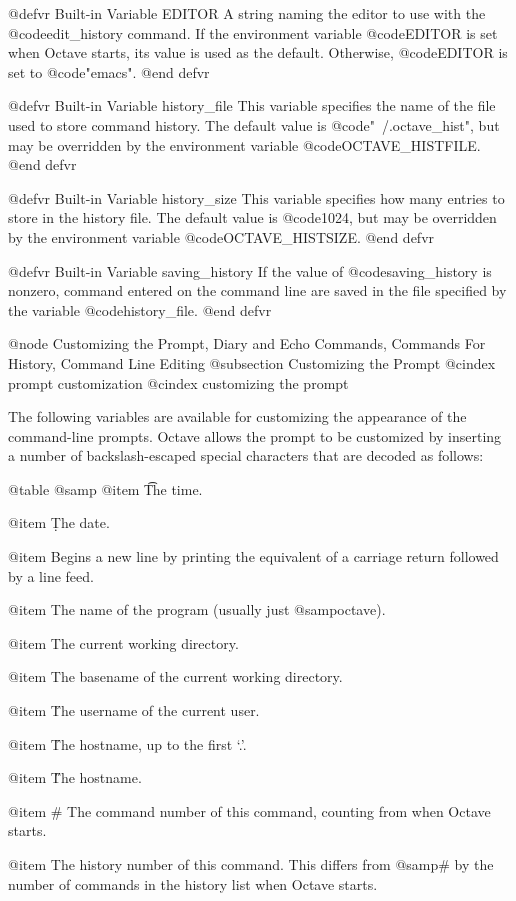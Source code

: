 @defvr {Built-in Variable} EDITOR
A string naming the editor to use with the @code{edit_history} command.
If the environment variable @code{EDITOR} is set when Octave starts, its
value is used as the default.  Otherwise, @code{EDITOR} is set to
@code{"emacs"}.
@end defvr

@defvr {Built-in Variable} history_file
This variable specifies the name of the file used to store command
history.  The default value is @code{"~/.octave_hist"}, but may be
overridden by the environment variable @code{OCTAVE_HISTFILE}.
@end defvr

@defvr {Built-in Variable} history_size
This variable specifies how many entries to store in the history file.
The default value is @code{1024}, but may be overridden by the
environment variable @code{OCTAVE_HISTSIZE}.
@end defvr

@defvr {Built-in Variable} saving_history
If the value of @code{saving_history} is nonzero, command entered
on the command line are saved in the file specified by the variable
@code{history_file}.
@end defvr

@node Customizing the Prompt, Diary and Echo Commands, Commands For History, Command Line Editing
@subsection Customizing the Prompt
@cindex prompt customization
@cindex customizing the prompt

The following variables are available for customizing the appearance of
the command-line prompts.  Octave allows the prompt to be customized by
inserting a number of backslash-escaped special characters that are
decoded as follows:

@table @samp
@item \t
The time.

@item \d
The date.

@item \n
Begins a new line by printing the equivalent of a carriage return
followed by a line feed.

@item \s
The name of the program (usually just @samp{octave}).

@item \w
The current working directory.

@item \W
The basename of the current working directory.

@item \u
The username of the current user.

@item \h
The hostname, up to the first `.'.

@item \H
The hostname.

@item \#
The command number of this command, counting from when Octave starts.

@item \!
The history number of this command.  This differs from @samp{\#} by the
number of commands in the history list when Octave starts.

